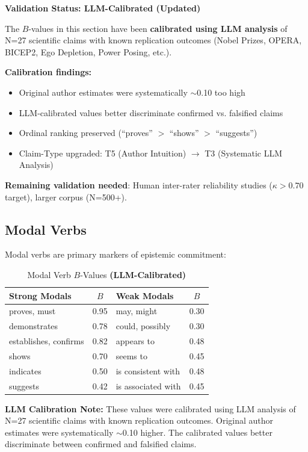 \documentclass[11pt,a4paper]{article}
\begin{document}
\begin{resultbox}
\textbf{Validation Status: LLM-Calibrated (Updated)}

The $B$-values in this section have been \textbf{calibrated using LLM analysis} of N=27 scientific claims with known replication outcomes (Nobel Prizes, OPERA, BICEP2, Ego Depletion, Power Posing, etc.).

\textbf{Calibration findings:}
\begin{itemize}
    \item Original author estimates were systematically $\sim$0.10 too high
    \item LLM-calibrated values better discriminate confirmed vs. falsified claims
    \item Ordinal ranking preserved (``proves'' $>$ ``shows'' $>$ ``suggests'')
    \item Claim-Type upgraded: T5 (Author Intuition) $\to$ T3 (Systematic LLM Analysis)
\end{itemize}
\textbf{Remaining validation needed}: Human inter-rater reliability studies ($\kappa > 0.70$ target), larger corpus (N=500+).
\end{resultbox}

\subsection{Modal Verbs}

Modal verbs are primary markers of epistemic commitment:

\begin{table}[h]
\centering
\caption{Modal Verb $B$-Values \textbf{(LLM-Calibrated)}}
\label{tab:modals}
\begin{tabular}{lc|lc}
\toprule
\textbf{Strong Modals} & \textbf{$B$} & \textbf{Weak Modals} & \textbf{$B$} \\
\midrule
proves, must & 0.95 & may, might & 0.30 \\
demonstrates & 0.78 & could, possibly & 0.30 \\
establishes, confirms & 0.82 & appears to & 0.48 \\
shows & 0.70 & seems to & 0.45 \\
indicates & 0.50 & is consistent with & 0.48 \\
suggests & 0.42 & is associated with & 0.45 \\
\bottomrule
\end{tabular}
\end{table}

\begin{insightbox}
\textbf{LLM Calibration Note:} These values were calibrated using LLM analysis of N=27 scientific claims with known replication outcomes. Original author estimates were systematically $\sim$0.10 higher. The calibrated values better discriminate between confirmed and falsified claims.
\end{insightbox}
\end{document}
